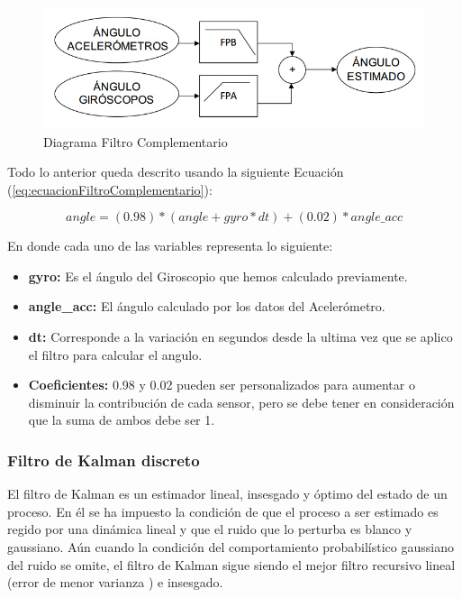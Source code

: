 \documentclass[12pt,a4paper]{article}
\begin{document}
\begin{figure}[H]
	\centering
	\includegraphics[scale=0.5]{images/FiltroComplementario}
	\caption{Diagrama Filtro Complementario}
	\label{fig:diagramafiltrocomplementario}
\end{figure}

Todo lo anterior queda descrito usando la siguiente Ecuación (\ref{eq:ecuacionFiltroComplementario}):

\begin{equation}
	\label{eq:ecuacionFiltroComplementario}
	angle = (0.98)*(angle+gyro*dt)+(0.02)*angle\_acc
\end{equation}

En donde cada uno de las variables representa lo siguiente:
\begin{itemize}
	\item \textbf{gyro:} Es el ángulo del Giroscopio que hemos calculado previamente.
	\item \textbf{angle\_acc:} El ángulo calculado por los datos del Acelerómetro.
	\item \textbf{dt:} Corresponde a la variación en segundos desde la ultima vez que se aplico el filtro para calcular el angulo.
	\item \textbf{Coeficientes:}  0.98 y 0.02 pueden ser personalizados para aumentar o disminuir la contribución de cada sensor, pero se debe tener en consideración que la suma de ambos debe ser 1.
\end{itemize}

\subsubsection{Filtro de Kalman discreto}
El filtro de Kalman es un estimador lineal, insesgado y óptimo del estado de un proceso. En él se ha impuesto la condición de que el proceso a ser estimado es regido por una dinámica lineal y que el ruido que lo perturba es blanco y gaussiano. Aún cuando la condición del comportamiento probabilístico gaussiano del ruido se omite, el filtro de Kalman sigue siendo el mejor filtro recursivo lineal (error de menor varianza ) e insesgado.
\end{document}
